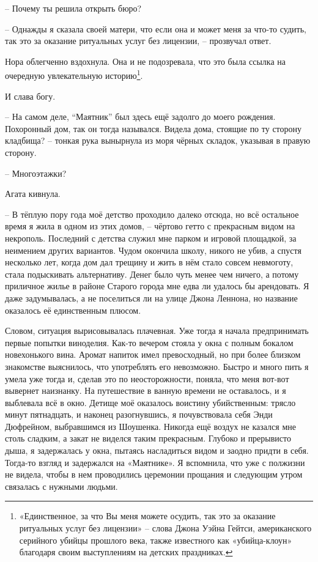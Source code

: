 \documentclass[
  a5paperpaper,
  DIV=11,
  numbers=noendperiod]{scrreprt}
\begin{document}
-- Почему ты решила открыть бюро?

-- Однажды я сказала своей матери, что если она и может меня за что-то
судить, так это за оказание ритуальных услуг без лицензии, -- прозвучал
ответ.

Нора облегченно вздохнула. Она и не подозревала, что это была ссылка на
очередную увлекательную историю\footnote{«Единственное, за что Вы меня
  можете осудить, так это за оказание ритуальных услуг без лицензии» --
  слова Джона Уэйна Гейтси, американского серийного убийцы прошлого
  века, также известного как «убийца-клоун» благодаря своим выступлениям
  на детских праздниках.}.

И слава богу.

-- На самом деле, ``Маятник'' был здесь ещё задолго до моего рождения.
Похоронный дом, так он тогда назывался. Видела дома, стоящие по ту
сторону кладбища? -- тонкая рука вынырнула из моря чёрных складок,
указывая в правую сторону.

-- Многоэтажки?

Агата кивнула.

-- В тёплую пору года моё детство проходило далеко отсюда, но всё
остальное время я жила в одном из этих домов, -- чёртово гетто с
прекрасным видом на некрополь. Последний с детства служил мне парком и
игровой площадкой, за неимением других вариантов. Чудом окончила школу,
никого не убив, а спустя несколько лет, когда дом дал трещину и жить в
нём стало совсем невмоготу, стала подыскивать альтернативу. Денег было
чуть менее чем ничего, а потому приличное жилье в районе Старого города
мне едва ли удалось бы арендовать. Я даже задумывалась, а не поселиться
ли на улице Джона Леннона, но название оказалось её единственным плюсом.

Словом, ситуация вырисовывалась плачевная. Уже тогда я начала
предпринимать первые попытки виноделия. Как-то вечером стояла у окна с
полным бокалом новехонького вина. Аромат напиток имел превосходный, но
при более близком знакомстве выяснилось, что употреблять его невозможно.
Быстро и много пить я умела уже тогда и, сделав это по неосторожности,
поняла, что меня вот-вот вывернет наизнанку. На путешествие в ванную
времени не оставалось, и я выблевала всё в окно. Детище моё оказалось
воистину убийственным: трясло минут пятнадцать, и наконец разогнувшись,
я почувствовала себя Энди Дюфрейном, выбравшимся из Шоушенка. Никогда
ещё воздух не казался мне столь сладким, а закат не виделся таким
прекрасным. Глубоко и прерывисто дыша, я задержалась у окна, пытаясь
насладиться видом и заодно придти в себя. Тогда-то взгляд и задержался
на «Маятнике». Я вспомнила, что уже с полжизни не видела, чтобы в нем
проводились церемонии прощания и следующим утром связалась с нужными
людьми.
\end{document}
